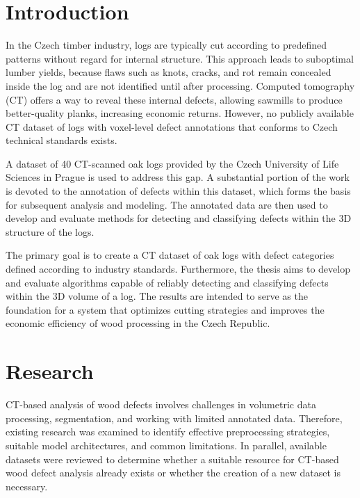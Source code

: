 \chapter*{Introduction}

In the Czech timber industry, logs are typically cut according to predefined patterns without regard for internal structure. This approach leads to suboptimal lumber yields, because flaws such as knots, cracks, and rot remain concealed inside the log and are not identified until after processing. Computed tomography (CT) offers a way to reveal these internal defects, allowing sawmills to produce better-quality planks, increasing economic returns. However, no publicly available CT dataset of logs with voxel-level defect annotations that conforms to Czech technical standards exists.

A dataset of 40 CT-scanned oak logs provided by the Czech University of Life Sciences in Prague is used to address this gap. A substantial portion of the work is devoted to the annotation of defects within this dataset, which forms the basis for subsequent analysis and modeling. The annotated data are then used to develop and evaluate methods for detecting and classifying defects within the 3D structure of the logs.

The primary goal is to create a CT dataset of oak logs with defect categories defined according to industry standards. Furthermore, the thesis aims to develop and evaluate algorithms capable of reliably detecting and classifying defects within the 3D volume of a log. The results are intended to serve as the foundation for a system that optimizes cutting strategies and improves the economic efficiency of wood processing in the Czech Republic.

\setcounter{page}{1}


\chapter{Research}
\label{chap:research}
CT-based analysis of wood defects involves challenges in volumetric data processing, segmentation, and working with limited annotated data. Therefore, existing research was examined to identify effective preprocessing strategies, suitable model architectures, and common limitations. In parallel, available datasets were reviewed to determine whether a suitable resource for CT-based wood defect analysis already exists or whether the creation of a new dataset is necessary.



